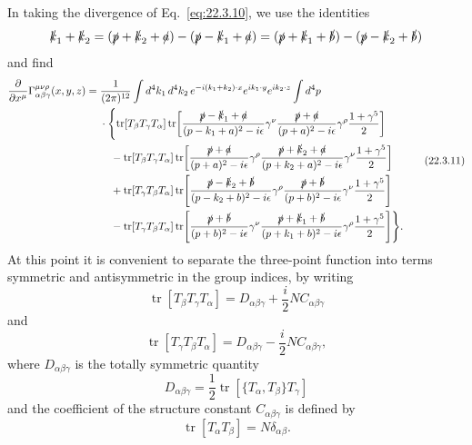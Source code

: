 In taking the divergence of Eq.~\eqref{eq:22.3.10}, we use the identities
\[
 \sl{k}_1+\sl{k}_2
 =(\sl{p}+\sl{k}_2+\sl{a})-(\sl{p}-\sl{k}_1+\sl{a})
 =(\sl{p}+\sl{k}_1+\sl{b})-(\sl{p}-\sl{k}_2+\sl{b})
\]
and find
\begin{equation}
 \begin{aligned}
 \frac{\partial}{\partial x^\mu}
 \Gamma_{\alpha\beta\gamma}^{\mu\nu\rho}(x,y,z)
 ={}&\frac{1}{(2\pi)^{12}}
 \int d^4k_1\,d^4k_2\,
 e^{-i(k_1+k_2)\cdot x}e^{ik_1\cdot y}e^{ik_2\cdot z}
 \int d^4p
 \\
 &\cdot\Biggl\{
 \operatorname{tr}[T_\beta T_\gamma T_\alpha]
 \operatorname{tr}\!\left[
  \frac{\sl{p}-\sl{k}_1+\sl{a}}{(p-k_1+a)^2-i\epsilon}\gamma^\nu
  \frac{\sl{p}+\sl{a}}{(p+a)^2-i\epsilon}\gamma^\rho
  \frac{1+\gamma^5}{2}
 \right]
 \\
 &\quad-\operatorname{tr}[T_\beta T_\gamma T_\alpha]
 \operatorname{tr}\!\left[
  \frac{\sl{p}+\sl{a}}{(p+a)^2-i\epsilon}\gamma^\rho
  \frac{\sl{p}+\sl{k}_2+\sl{a}}{(p+k_2+a)^2-i\epsilon}\gamma^\nu
  \frac{1+\gamma^5}{2}
 \right]
 \\
 &\quad+\operatorname{tr}[T_\gamma T_\beta T_\alpha]
 \operatorname{tr}\!\left[
  \frac{\sl{p}-\sl{k}_2+\sl{b}}{(p-k_2+b)^2-i\epsilon}\gamma^\rho
  \frac{\sl{p}+\sl{b}}{(p+b)^2-i\epsilon}\gamma^\nu
  \frac{1+\gamma^5}{2}
 \right]
 \\
 &\quad-\operatorname{tr}[T_\gamma T_\beta T_\alpha]
 \operatorname{tr}\!\left[
  \frac{\sl{p}+\sl{b}}{(p+b)^2-i\epsilon}\gamma^\nu
  \frac{\sl{p}+\sl{k}_1+\sl{b}}{(p+k_1+b)^2-i\epsilon}\gamma^\rho
  \frac{1+\gamma^5}{2}
 \right]
 \Biggr\}.
 \end{aligned}
 \tag{22.3.11}\label{eq:22.3.11}
\end{equation}
At this point it is convenient to separate the three-point function into
terms symmetric and antisymmetric in the group indices, by writing
\[
 \operatorname{tr}[T_\beta T_\gamma T_\alpha]
 =D_{\alpha\beta\gamma}+\frac{i}{2}NC_{\alpha\beta\gamma}
\]
and
\[
 \operatorname{tr}[T_\gamma T_\beta T_\alpha]
 =D_{\alpha\beta\gamma}-\frac{i}{2}NC_{\alpha\beta\gamma},
\]
where $D_{\alpha\beta\gamma}$ is the totally symmetric quantity
\begin{equation}
 D_{\alpha\beta\gamma}
 =\frac12\operatorname{tr}\!\left[\{T_\alpha,T_\beta\}T_\gamma\right]
 \tag{22.3.12}\label{eq:22.3.12}
\end{equation}
and the coefficient of the structure constant $C_{\alpha\beta\gamma}$ is
defined by
\[
 \operatorname{tr}[T_\alpha T_\beta]=N\delta_{\alpha\beta}.
\]

